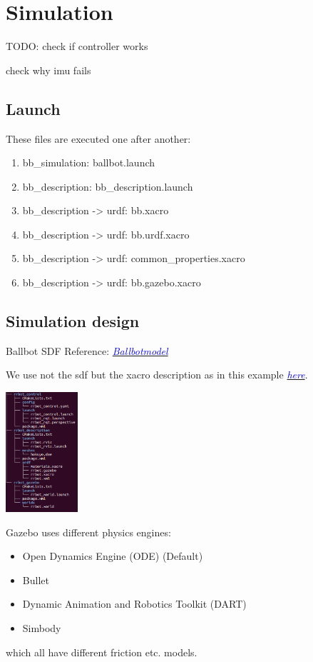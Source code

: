 \documentclass[twoside,colorback,accentcolor=tud4c,11pt]{tudreport}
\newcommand{\mylink}[2] {	\hyperlink{#1}{	\textit{\textcolor{blue}{#2}}}}
\begin{document}
\chapter{Simulation}

TODO: 
check if controller works

check why imu fails

\section{Launch}
These files are executed one after another:
\begin{enumerate}
	\item bb\_simulation: ballbot.launch
	\item bb\_description: bb\_description.launch
	\item bb\_description -> urdf: bb.xacro
	\item bb\_description -> urdf: bb.urdf.xacro
	\item bb\_description -> urdf: common\_properties.xacro
	\item bb\_description -> urdf: bb.gazebo.xacro
\end{enumerate}

\section{Simulation design}

Ballbot SDF Reference:
\mylink{https://bitbucket.org/osrf/gazebo/issues/2335/how-to-set-the-friction-of-ballbot-the}{Ballbotmodel} 

We use not the sdf but the xacro description as in this example \mylink{http://gazebosim.org/tutorials/?tut=ros_urdf}{here}.

\begin{center}
		\includegraphics[width=0.2\textwidth]{img/filestructure.png} 
\end{center}

Gazebo uses different physics engines:\\
\begin{itemize}
	\item Open Dynamics Engine (ODE) (Default)
	\item Bullet
	\item Dynamic Animation and Robotics Toolkit (DART)
	\item Simbody
\end{itemize}
 which all have different friction etc. models.
\end{document}
